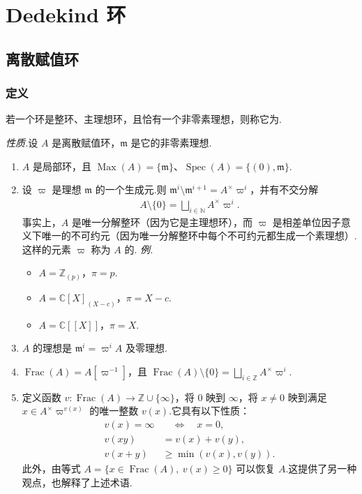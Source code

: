 \chapter{Dedekind 环}\label{chap:nt-3}
\section{离散赋值环}\label{sec:nt-3-1}
\subsection{定义}\label{sec:nt-3-1-1}
\begin{definition*}
若一个环是整环、主理想环，且恰有一个非零素理想，则称它为.
\end{definition*}
\emph{性质.}设 $A$ 是离散赋值环，$\mathfrak m$ 是它的非零素理想.
\begin{enumerate}[label=\roman*)]
\item $A$ 是局部环，且 $\operatorname{Max}(A)=\{\mathfrak m\}$、$\operatorname{Spec}(A)=\{(0),\mathfrak m\}$.
\item 设 $\varpi$ 是理想 $\mathfrak m$ 的一个生成元.则 $\mathfrak m^i\setminus\mathfrak m^{i+1}=A^\times\varpi^i$，并有不交分解
\begin{align*}
A\setminus\{0\}=\bigsqcup_{i\in\mathbb N}A^\times\varpi^i.
\end{align*}
事实上，$A$ 是唯一分解整环（因为它是主理想环），而 $\varpi$ 是相差单位因子意义下唯一的不可约元（因为唯一分解整环中每个不可约元都生成一个素理想）.这样的元素 $\varpi$ 称为 $A$ 的.
\emph{例.}
\begin{itemize}
\item $A=\mathbb Z_{(p)}$，$\pi=p$.
\item $A=\mathbb C[X]_{(X-c)}$，$\pi=X-c$.
\item $A=\mathbb C[[X]]$，$\pi=X$.
\end{itemize}
\item $A$ 的理想是 $\mathfrak m^i=\varpi^iA$ 及零理想.
\item $\operatorname{Frac}(A)=A[\varpi^{-1}]$，且 $\operatorname{Frac}(A)\setminus\{0\}=\bigsqcup_{i\in\mathbb Z}A^\times\varpi^i$.
\item 定义函数 $v\colon\operatorname{Frac}(A)\longrightarrow\mathbb Z\cup\{\infty\}$，将 $0$ 映到 $\infty$，将 $x\ne0$ 映到满足 $x\in A^\times\varpi^{v(x)}$ 的唯一整数 $v(x)$.它具有以下性质：
\begin{align*}
v(x)=\infty&\quad\Longleftrightarrow\quad x=0,\\
v(xy)&=v(x)+v(y),\\
v(x+y)&\ge\min(v(x),v(y)).
\end{align*}
此外，由等式 $A=\{x\in\operatorname{Frac}(A),\ v(x)\ge0\}$ 可以恢复 $A$.这提供了另一种观点，也解释了上述术语.
\end{enumerate}

